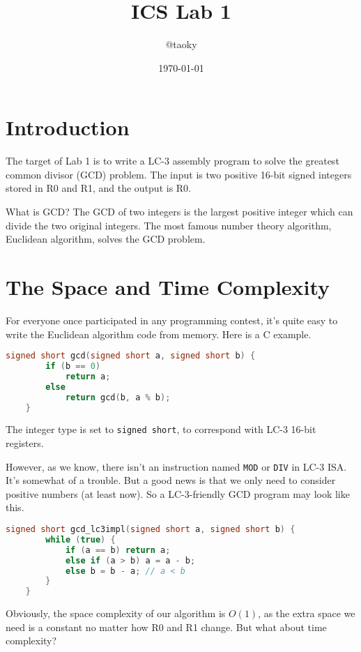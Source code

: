 \documentclass{article}
\title{ICS Lab 1}
\author{@taoky}
\date{\today}
\begin{document}
	\maketitle
	\section{Introduction}
	The target of Lab 1 is to write a LC-3 assembly program to solve the greatest common divisor (GCD) problem. The input is two positive 16-bit signed integers stored in R0 and R1, and the output is R0.
	
	What is GCD? The GCD of two integers is the largest positive integer which can divide the two original integers. The most famous number theory algorithm, Euclidean algorithm, solves the GCD problem.
	
	\section{The Space and Time Complexity}
	
	For everyone once participated in any programming contest, it's quite easy to write the Euclidean algorithm code from memory. Here is a C example.
	
	\begin{lstlisting}[language=c, caption={The Euclidean algorithm code in C}]
	signed short gcd(signed short a, signed short b) {
		if (b == 0)
			return a;
		else
			return gcd(b, a % b);
	}
	\end{lstlisting}
	
	The integer type is set to \texttt{signed short}, to correspond with LC-3 16-bit registers.
	
	However, as we know, there isn't an instruction named \texttt{MOD} or \texttt{DIV} in LC-3 ISA. It's somewhat of a trouble. But a good news is that we only need to consider positive numbers (at least now). So a LC-3-friendly GCD program may look like this.
	
	\begin{lstlisting}[language=c, caption={The Euclidean algorithm code, with only subtraction}]
	signed short gcd_lc3impl(signed short a, signed short b) {
		while (true) {
			if (a == b) return a;
			else if (a > b) a = a - b;
			else b = b - a; // a < b
		}
	}
	\end{lstlisting}
	
	Obviously, the space complexity of our algorithm is $O(1)$, as the extra space we need is a constant no matter how R0 and R1 change. But what about time complexity?
	
\end{document}
